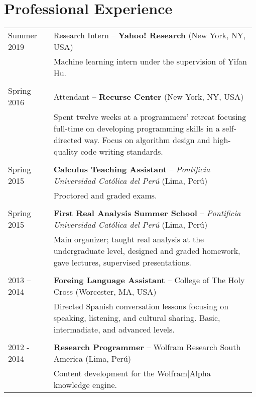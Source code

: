 \documentclass[12pt,]{scrartcl}
\begin{document}
\section{Professional Experience}\label{experience}
\begin{table}[h]
{\def\arraystretch{1}\tabcolsep=0pt
\begin{tabular}{p{0.18\linewidth}p{0.8\linewidth}}

Summer 2019 &
Research Intern -- \textbf{Yahoo! Research} (New York, NY, USA) \\
& Machine learning intern under the supervision of Yifan Hu. \\ \\

Spring 2016 &
Attendant -- \textbf{Recurse Center} (New York, NY, USA) \\
& Spent twelve weeks at a programmers' retreat focusing full-time on developing programming skills in a self-directed way. Focus on algorithm design and high-quality code writing standards. \\ \\

Spring 2015 &
\textbf{Calculus Teaching Assistant} -- \textit{Pontificia Universidad Católica del Perú} (Lima, Perú) \\
& Proctored and graded exams. \\ \\

Spring 2015 &
\textbf{First Real Analysis Summer School} -- \textit{Pontificia Universidad Católica del Perú} (Lima, Perú) \\ 
& Main organizer; taught real analysis at the undergraduate level, designed and graded homework, gave lectures, supervised presentations. \\ \\

2013 -- 2014 &
\textbf{Foreing Language Assistant} -- College of The Holy Cross (Worcester, MA, USA) \\
& Directed Spanish conversation lessons focusing on speaking, listening, and cultural sharing. Basic, intermadiate, and advanced levels. \\ \\

2012 - 2014 &
\textbf{Research Programmer} -- Wolfram Research South America (Lima, Perú) \\
& Content development for the Wolfram|Alpha knowledge engine. \\

\end{tabular}}
\end{table}
\end{document}

